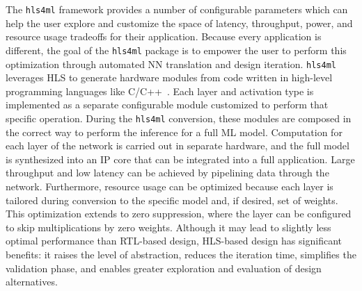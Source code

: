 \documentclass[sigconf]{acmart}
\newcommand{\hlsfml}{\texttt{hls4ml}\xspace}
\begin{document}

The \hlsfml framework provides a number of configurable parameters which can help the user explore and customize the space of latency, throughput, power, and resource usage tradeoffs for their application. 
Because every application is different, the goal of the \hlsfml package is to empower the user to perform this optimization through automated NN translation and design iteration. 
\hlsfml leverages HLS to generate hardware modules from code written in high-level programming languages like \textsc{C}/\textsc{C++}~\cite{numan2020towards}.
Each layer and activation type is implemented as a separate configurable module customized to perform that specific operation. 
During the \hlsfml conversion, these modules are composed in the correct way to perform the inference for a full ML model.
Computation for each layer of the network is carried out in separate hardware, and the full model is synthesized into an IP core that can be integrated into a full application.
Large throughput and low latency can be achieved by pipelining data through the network. 
Furthermore, resource usage can be optimized because each layer is tailored during conversion to the specific model and, if desired, set of weights. 
This optimization extends to zero suppression, where the layer can be configured to skip multiplications by zero weights. 
Although it may lead to slightly less optimal performance than RTL-based design, HLS-based design has significant benefits: it raises the level of abstraction, reduces the iteration time, simplifies the validation phase, and enables greater exploration and evaluation of design alternatives.
\end{document}
